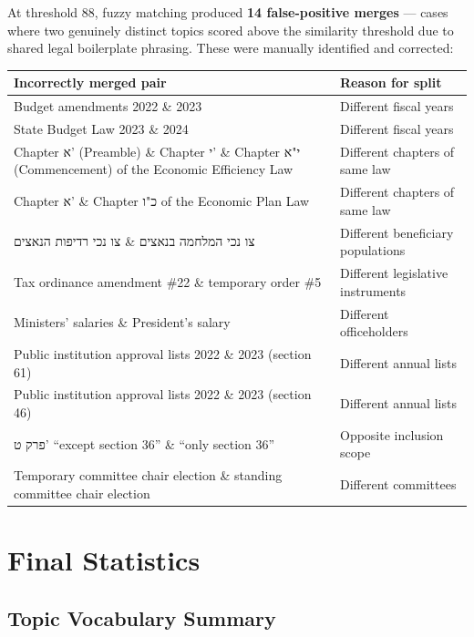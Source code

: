 \documentclass[11pt,a4paper]{article}
\begin{document}
At threshold 88, fuzzy matching produced \textbf{14 false-positive merges} --- cases where
two genuinely distinct topics scored above the similarity threshold due to shared legal
boilerplate phrasing. These were manually identified and corrected:

\begin{center}
\begin{tabular}{p{8cm}p{5cm}}
\toprule
\textbf{Incorrectly merged pair} & \textbf{Reason for split} \\
\midrule
Budget amendments 2022 \& 2023 & Different fiscal years \\
State Budget Law 2023 \& 2024 & Different fiscal years \\
Chapter \texthebrew{א'} (Preamble) \& Chapter \texthebrew{י'} \& Chapter \texthebrew{י"א} (Commencement) of the Economic Efficiency Law & Different chapters of same law \\
Chapter \texthebrew{א'} \& Chapter \texthebrew{כ"ו} of the Economic Plan Law & Different chapters of same law \\
\texthebrew{צו נכי המלחמה בנאצים} \& \texthebrew{צו נכי רדיפות הנאצים} & Different beneficiary populations \\
Tax ordinance amendment \#22 \& temporary order \#5 & Different legislative instruments \\
Ministers' salaries \& President's salary & Different officeholders \\
Public institution approval lists 2022 \& 2023 (section 61) & Different annual lists \\
Public institution approval lists 2022 \& 2023 (section 46) & Different annual lists \\
\texthebrew{פרק ט'} ``except section 36'' \& ``only section 36'' & Opposite inclusion scope \\
Temporary committee chair election \& standing committee chair election & Different committees \\
\bottomrule
\end{tabular}
\end{center}

\section{Final Statistics}

\subsection*{Topic Vocabulary Summary}
\end{document}
